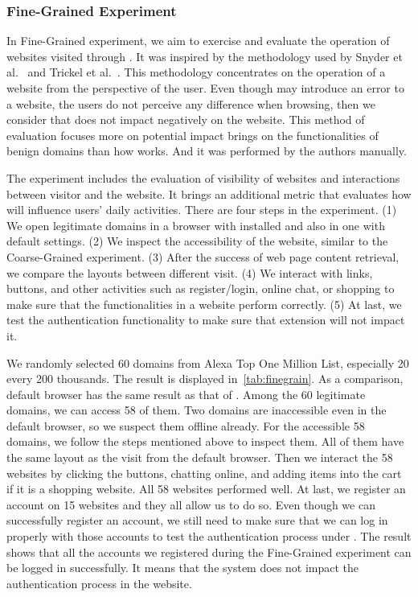\subsubsection{Fine-Grained Experiment}

\finegrain


In Fine-Grained experiment, we aim to exercise and evaluate the operation of websites visited through \spartacus.
It was inspired by the methodology used by Snyder et al.~\cite{snyder2017most} and Trickel et al.~\cite{trickel2019everyone}.
This methodology concentrates on the operation of a website from the perspective of the user.
Even though \spartacus may introduce an error to a website, the users do not perceive any difference when browsing, then we consider that \spartacus does not impact negatively on the website.
This method of evaluation focuses more on potential impact \spartacus brings on the functionalities of benign domains than how \spartacus works.
And it was performed by the authors manually.

The experiment includes the evaluation of visibility of websites and interactions between visitor and the website.
It brings an additional metric that evaluates how \spartacus will influence users' daily activities.
There are four steps in the experiment.
(1) We open legitimate domains in a browser with \spartacus installed and also in one with default settings.
(2) We inspect the accessibility of the website, similar to the Coarse-Grained experiment.
(3) After the success of web page content retrieval, we compare the layouts between different visit.
(4) We interact with links, buttons, and other activities such as register/login, online chat, or shopping to make sure that the functionalities in a website perform correctly.
(5) At last, we test the authentication functionality to make sure that \spartacus extension will not impact it.

We randomly selected 60 domains from Alexa Top One Million List, especially 20 every 200 thousands.
The result is displayed in~\autoref{tab:finegrain}.
As a comparison, default browser has the same result as that of \spartacus.
Among the 60 legitimate domains, we can access 58 of them.
Two domains are inaccessible even in the default browser, so we suspect them offline already.
For the accessible 58 domains,
we follow the steps mentioned above to inspect them.
All of them have the same layout as the visit from the default browser.
Then we interact the 58 websites by clicking the buttons, chatting online, and adding items into the cart if it is a shopping website.
All 58 websites performed well.
At last, we register an account on 15 websites and they all allow us to do so.
Even though we can successfully register an account, we still need to make sure that we can log in properly with those accounts to test the authentication process under \spartacus.
The result shows that all the accounts we registered during the Fine-Grained experiment can be logged in successfully.
It means that the \spartacus system does not impact the authentication process in the website.


